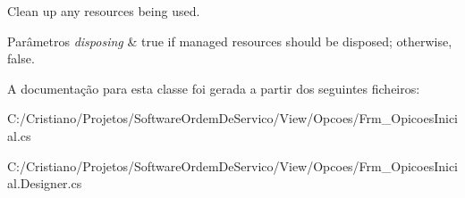 Clean up any resources being used. 


\begin{DoxyParams}{Parâmetros}
{\em disposing} & true if managed resources should be disposed; otherwise, false.\\
\hline
\end{DoxyParams}


A documentação para esta classe foi gerada a partir dos seguintes ficheiros\+:\begin{DoxyCompactItemize}
\item 
C\+:/\+Cristiano/\+Projetos/\+Software\+Ordem\+De\+Servico/\+View/\+Opcoes/Frm\+\_\+\+Opicoes\+Inicial.\+cs\item 
C\+:/\+Cristiano/\+Projetos/\+Software\+Ordem\+De\+Servico/\+View/\+Opcoes/Frm\+\_\+\+Opicoes\+Inicial.\+Designer.\+cs\end{DoxyCompactItemize}
